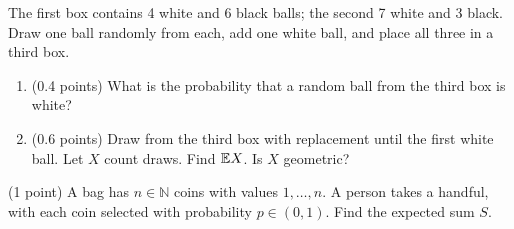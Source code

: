 \documentclass[a4paper]{report}
\newif\ifshowsolutions
\begin{document}
\begin{problem}
The first box contains 4 white and 6 black balls; the second 7 white and 3 black. Draw one ball randomly from each, add one white ball, and place all three in a third box.
\begin{enumerate}
\item (0.4 points) What is the probability that a random ball from the third box is white?
\ifshowsolutions
\par\textbf{Solution.} Let $A$ mean a white draw from the third box, and $B_{xy}$ mean colours $x,y$ from the first two, with $W$ for white and $B$ for black. Total probability gives
\begin{align*}
\P(A)&=\P(A\mid B_{WW})\P(B_{WW})+\P(A\mid B_{BW})[\P(B_{BW})+\P(B_{WB})]+\P(A\mid B_{BB})\P(B_{BB})\\
&=1\cdot\frac{4\cdot7}{100}+\frac23\frac{4\cdot3+6\cdot7}{100}+\frac13\frac{6\cdot3}{100}=\frac7{10}.
\end{align*}
\fi
\item (0.6 points) Draw from the third box with replacement until the first white ball. Let $X$ count draws. Find $\mathbb {E} X$. Is $X$ geometric?
\ifshowsolutions
\par\textbf{Solution.} (0.3 points if all calculations are otherwise correct but use a geometric law with the probability from part 1.) With three white balls the first draw succeeds. With two white and one black, $X\sim\mathrm{Ge}(2/3)$ conditionally and its mean is $3/2$. With one white and two black the conditional law is $\mathrm{Ge}(1/3)$, with mean 3. Thus
\begin{align*}
\E X&=\E[X\mid B_{WW}]\P(B_{WW})+\E[X\mid B_{BW}][\P(B_{BW})+\P(B_{WB})]+\E[X\mid B_{BB}]\P(B_{BB})\\
&=\frac{28}{100}+\frac32\frac{54}{100}+3\frac{18}{100}=\frac{163}{100}.
\end{align*}
If $X$ were geometric, part 1 would require $\mathrm{Ge}(7/10)$ and mean $10/7$, contrary to this calculation.
\fi
\end{enumerate}
\end{problem}
\begin{problem} (1 point)
A bag has $n\in\mathbb N$ coins with values $1,\ldots,n$. A person takes a handful, with each coin selected with probability $p\in(0,1)$. Find the expected sum $S$.
\ifshowsolutions
\par\textbf{Solution.} (0.1--0.2 or more for partial reasoning.) Let $X_k$ indicate selection of coin $k$. Then $X_k\sim\mathrm{Ber}(p)$ and $\E X_k=p$. Linearity gives
\[\E S=\E\left[\sum_{k=1}^nkX_k\right]=\sum_{k=1}^nk\E X_k=\frac{pn(n+1)}2.\]
\fi
\end{problem}
\end{document}
